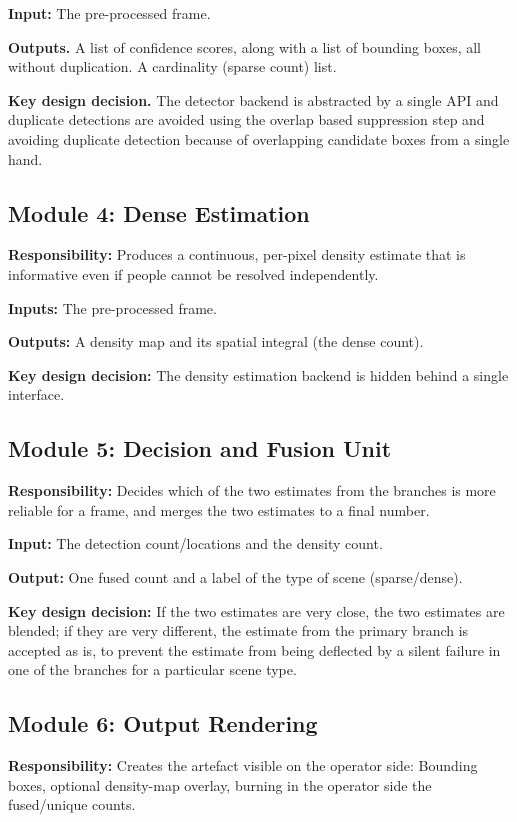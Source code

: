 \textbf{Input:} The pre-processed frame.

\textbf{Outputs.} A list of confidence scores, along with a list of bounding boxes, all without duplication. A cardinality (sparse count) list.

\textbf{Key design decision.} The detector backend is abstracted by a single API and duplicate detections are avoided using the overlap based suppression step and avoiding duplicate detection because of overlapping candidate boxes from a single hand.

\subsection{Module 4: Dense Estimation}

\textbf{Responsibility:} Produces a continuous, per-pixel density estimate that is informative even if people cannot be resolved independently.

\textbf{Inputs:} The pre-processed frame.

\textbf{Outputs:} A density map and its spatial integral (the dense count).

\textbf{Key design decision:} The density estimation backend is hidden behind a single interface.

\subsection{Module 5: Decision and Fusion Unit}

\textbf{Responsibility:} Decides which of the two estimates from the branches is more reliable for a frame, and merges the two estimates to a final number.

\textbf{Input:} The detection count/locations and the density count.

\textbf{Output:} One fused count and a label of the type of scene (sparse/dense).

\textbf{Key design decision:} If the two estimates are very close, the two estimates are blended; if they are very different, the estimate from the primary branch is accepted as is, to prevent the estimate from being deflected by a silent failure in one of the branches for a particular scene type.

\subsection{Module 6: Output Rendering}

\textbf{Responsibility:} Creates the artefact visible on the operator side: Bounding boxes, optional density-map overlay, burning in the operator side the fused/unique counts.

